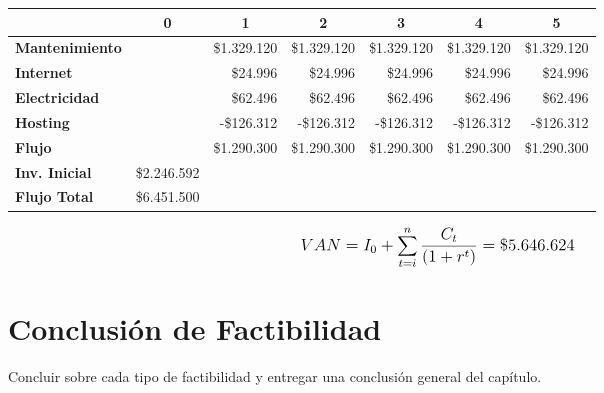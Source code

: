 \begin{center}
	\begin{tabular}{ | l | l | l | l | l | l | l |}
		\hline
		& \multicolumn{1}{|c|}{\textbf{0}} & \multicolumn{1}{|c|}{\textbf{1}} & \multicolumn{1}{|c|}{\textbf{2}} & \multicolumn{1}{|c|}{\textbf{3}} & \multicolumn{1}{|c|}{\textbf{4}} & \multicolumn{1}{|c|}{\textbf{5}} \\
		\hline
		{\textbf{Mantenimiento}} &  & \multicolumn{1}{|r|}{\$1.329.120} & \multicolumn{1}{|r|}{\$1.329.120} & \multicolumn{1}{|r|}{\$1.329.120} & \multicolumn{1}{|r|}{\$1.329.120} & \multicolumn{1}{|r|}{\$1.329.120} \\ \hline
		
		{\textbf{Internet}} &  & \multicolumn{1}{|r|}{\$24.996} & \multicolumn{1}{|r|}{\$24.996} & \multicolumn{1}{|r|}{\$24.996} & \multicolumn{1}{|r|}{\$24.996} & \multicolumn{1}{|r|}{\$24.996} \\ \hline
		
		{\textbf{Electricidad}} &  & \multicolumn{1}{|r|}{\$62.496} & \multicolumn{1}{|r|}{\$62.496} & \multicolumn{1}{|r|}{\$62.496} & \multicolumn{1}{|r|}{\$62.496} & \multicolumn{1}{|r|}{\$62.496} \\ \hline
		
		{\textbf{Hosting}} &  & \multicolumn{1}{|r|}{-\$126.312} & \multicolumn{1}{|r|}{-\$126.312} & \multicolumn{1}{|r|}{-\$126.312} & \multicolumn{1}{|r|}{-\$126.312} & \multicolumn{1}{|r|}{-\$126.312} \\ \hline
		
		{\textbf{Flujo}} &  & \multicolumn{1}{|r|}{\$1.290.300} & \multicolumn{1}{|r|}{\$1.290.300} & \multicolumn{1}{|r|}{\$1.290.300} & \multicolumn{1}{|r|}{\$1.290.300} & \multicolumn{1}{|r|}{\$1.290.300} \\ \hline
		{\textbf{Inv. Inicial}} & \multicolumn{1}{|r|}{\$2.246.592} & & & & & \\ \hline
		\textbf{Flujo Total} & \multicolumn{1}{|r|}{\$6.451.500} & & & & & \\ \hline
	\end{tabular}

  \label{table:van}
\end{center}

\[
\mathlarger{
	{VAN} = I_0 + \sum\limits_{t=i}^{n}\frac{C_t}{\left(1+r^t\right)} = \$5.646.624
}
\]

\section{Conclusión de Factibilidad}
Concluir sobre cada tipo de factibilidad y entregar una conclusión general del capítulo.
